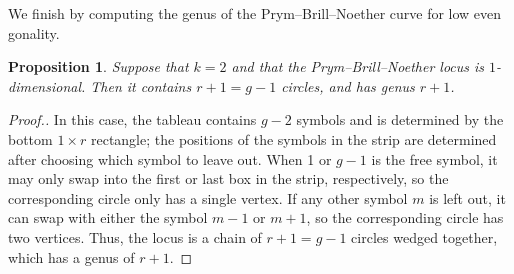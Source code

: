 \documentclass[11pt,reqno]{amsart}
\newcommand{\derek}[1]{{\color{Green} \sf D: [#1]}}
\theoremstyle{definition}
\theoremstyle{problem}
\theoremstyle{plain}
\newtheorem{proposition}[definition]{Proposition}
\theoremstyle{remark}
\theoremstyle{theorem}
\numberwithin{equation}{section}
\numberwithin{figure}{section}
\begin{document}
%

We finish by computing the genus of the Prym--Brill--Noether curve for low even gonality. 
\begin{proposition}\label{prop:k2dim1}
  Suppose that $k=2$ and that the Prym--Brill--Noether locus is $1$-dimensional. Then it contains  $r+1=g-1$ circles, and has genus $r+1$.
\end{proposition}

\begin{proof}[Proof.]
  In this case, the tableau contains $g-2$ symbols and is determined by the bottom $1\times r$ rectangle; the positions of the symbols in the strip are determined after choosing which symbol to leave out.  When 1 or $g-1$ is the free symbol, it may only swap into the first or last box in the strip,   respectively, so the corresponding circle only has a single vertex. If any other symbol $m$ is left out,  it can swap with either the symbol $m-1$ or $m+1$, so the corresponding circle has two vertices. Thus, the locus is a chain of $r+1=g-1$ circles wedged together, which has a genus of $r+1$.
\end{proof}
\end{document}
